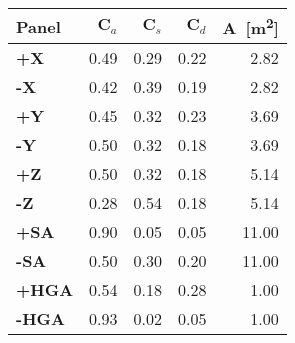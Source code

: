 \begin{tabular}{lrrrr}
\toprule
\bfseries Panel & \bfseries $\mathbf C_a$ & \bfseries $\mathbf C_s$ & \bfseries $\mathbf C_d$ & $\mathbf A$~[\unit{\meter\squared}] \\
\midrule
\bfseries +X & 0.49 & 0.29 & 0.22 & 2.82 \\
\bfseries -X & 0.42 & 0.39 & 0.19 & 2.82 \\
\bfseries +Y & 0.45 & 0.32 & 0.23 & 3.69 \\
\bfseries -Y & 0.50 & 0.32 & 0.18 & 3.69 \\
\bfseries +Z & 0.50 & 0.32 & 0.18 & 5.14 \\
\bfseries -Z & 0.28 & 0.54 & 0.18 & 5.14 \\
\bfseries +SA & 0.90 & 0.05 & 0.05 & 11.00 \\
\bfseries -SA & 0.50 & 0.30 & 0.20 & 11.00 \\
\bfseries +HGA & 0.54 & 0.18 & 0.28 & 1.00 \\
\bfseries -HGA & 0.93 & 0.02 & 0.05 & 1.00 \\
\bottomrule
\end{tabular}
